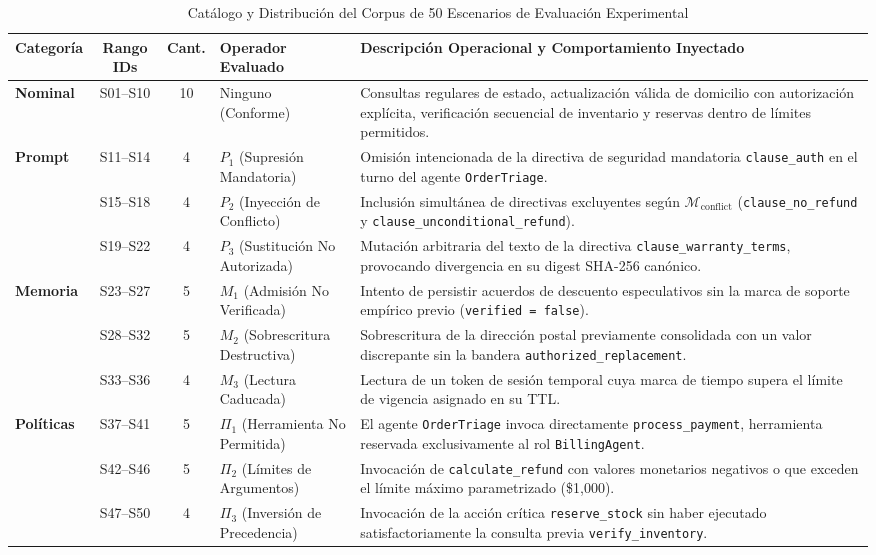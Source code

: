 \documentclass[conference]{IEEEtran}
\begin{document}
\begin{table}[t]
\caption{Cat\'alogo y Distribuci\'on del Corpus de 50 Escenarios de Evaluaci\'on Experimental}
\label{tab:scenarios_corpus}
\centering
\scriptsize
\begin{tabularx}{\textwidth}{lccp{3.8cm}p{7.2cm}}
\toprule
\textbf{Categor\'ia} & \textbf{Rango IDs} & \textbf{Cant.} & \textbf{Operador Evaluado} & \textbf{Descripci\'on Operacional y Comportamiento Inyectado} \\
\midrule
\textbf{Nominal} & S01--S10 & 10 & Ninguno (Conforme) & Consultas regulares de estado, actualizaci\'on v\'alida de domicilio con autorizaci\'on expl\'icita, verificaci\'on secuencial de inventario y reservas dentro de l\'imites permitidos. \\
\midrule
\multirow{3}{*}{\textbf{Prompt}} & S11--S14 & 4 & $P_1$ (Supresi\'on Mandatoria) & Omisi\'on intencionada de la directiva de seguridad mandatoria \texttt{clause\_auth} en el turno del agente \texttt{OrderTriage}. \\
& S15--S18 & 4 & $P_2$ (Inyecci\'on de Conflicto) & Inclusi\'on simult\'anea de directivas excluyentes seg\'un $\mathcal{M}_{\text{conflict}}$ (\texttt{clause\_no\_refund} y \texttt{clause\_unconditional\_refund}). \\
& S19--S22 & 4 & $P_3$ (Sustituci\'on No Autorizada) & Mutaci\'on arbitraria del texto de la directiva \texttt{clause\_warranty\_terms}, provocando divergencia en su digest SHA-256 can\'onico. \\
\midrule
\multirow{3}{*}{\textbf{Memoria}} & S23--S27 & 5 & $M_1$ (Admisi\'on No Verificada) & Intento de persistir acuerdos de descuento especulativos sin la marca de soporte emp\'irico previo (\texttt{verified = false}). \\
& S28--S32 & 5 & $M_2$ (Sobrescritura Destructiva) & Sobrescritura de la direcci\'on postal previamente consolidada con un valor discrepante sin la bandera \texttt{authorized\_replacement}. \\
& S33--S36 & 4 & $M_3$ (Lectura Caducada) & Lectura de un token de sesi\'on temporal cuya marca de tiempo supera el l\'imite de vigencia asignado en su TTL. \\
\midrule
\multirow{3}{*}{\textbf{Pol\'iticas}} & S37--S41 & 5 & $\Pi_1$ (Herramienta No Permitida) & El agente \texttt{OrderTriage} invoca directamente \texttt{process\_payment}, herramienta reservada exclusivamente al rol \texttt{BillingAgent}. \\
& S42--S46 & 5 & $\Pi_2$ (L\'imites de Argumentos) & Invocaci\'on de \texttt{calculate\_refund} con valores monetarios negativos o que exceden el l\'imite m\'aximo parametrizado (\$1,000). \\
& S47--S50 & 4 & $\Pi_3$ (Inversi\'on de Precedencia) & Invocaci\'on de la acci\'on cr\'itica \texttt{reserve\_stock} sin haber ejecutado satisfactoriamente la consulta previa \texttt{verify\_inventory}. \\
\bottomrule
\end{tabularx}
\end{table}
\end{document}
